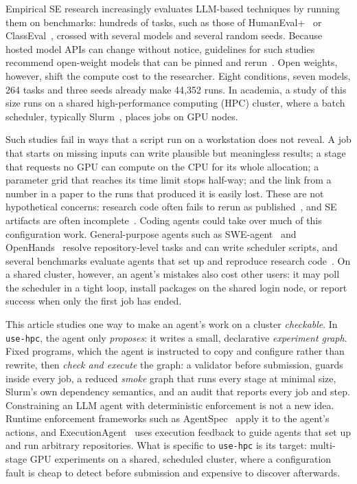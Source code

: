 \documentclass[pdflatex,sn-mathphys-num]{sn-jnl}
\theoremstyle{thmstyletwo}%
\theoremstyle{thmstylethree}%
\newcommand{\tool}{\texttt{use-hpc}}
\begin{document}
Empirical SE research increasingly evaluates LLM-based techniques by running them on benchmarks: hundreds of tasks, such as those of HumanEval+~\cite{liu2023evalplus} or ClassEval~\cite{du2024classeval}, crossed with several models and several random seeds. Because hosted model APIs can change without notice, guidelines for such studies recommend open-weight models that can be pinned and rerun~\cite{sallou2024breaking,baltes2025guidelines}. Open weights, however, shift the compute cost to the researcher. Eight conditions, seven models, 264 tasks and three seeds already make 44{,}352 runs. In academia, a study of this size runs on a shared high-performance computing (HPC) cluster, where a batch scheduler, typically Slurm~\cite{yoo2003slurm}, places jobs on GPU nodes.

Such studies fail in ways that a script run on a workstation does not reveal. A job that starts on missing inputs can write plausible but meaningless results; a stage that requests no GPU can compute on the CPU for its whole allocation; a parameter grid that reaches its time limit stops half-way; and the link from a number in a paper to the runs that produced it is easily lost. These are not hypothetical concerns: research code often fails to rerun as published~\cite{collberg2016repeatability,pimentel2019jupyter,trisovic2022research}, and SE artifacts are often incomplete~\cite{timperley2021artifact,liu2024artifacts}. Coding agents could take over much of this configuration work. General-purpose agents such as SWE-agent~\cite{yang2024sweagent} and OpenHands~\cite{wang2025openhands} resolve repository-level tasks and can write scheduler scripts, and several benchmarks evaluate agents that set up and reproduce research code~\cite{bogin2024super,siegel2024corebench,starace2025paperbench,baek2026artisan}. On a shared cluster, however, an agent's mistakes also cost other users: it may poll the scheduler in a tight loop, install packages on the shared login node, or report success when only the first job has ended.

This article studies one way to make an agent's work on a cluster \emph{checkable}. In \tool{}, the agent only \emph{proposes}: it writes a small, declarative \emph{experiment graph}. Fixed programs, which the agent is instructed to copy and configure rather than rewrite, then \emph{check and execute} the graph: a validator before submission, guards inside every job, a reduced \emph{smoke} graph that runs every stage at minimal size, Slurm's own dependency semantics, and an audit that reports every job and step. Constraining an LLM agent with deterministic enforcement is not a new idea. Runtime enforcement frameworks such as AgentSpec~\cite{wang2026agentspec} apply it to the agent's actions, and ExecutionAgent~\cite{bouzenia2025executionagent} uses execution feedback to guide agents that set up and run arbitrary repositories. What is specific to \tool{} is its target: multi-stage GPU experiments on a shared, scheduled cluster, where a configuration fault is cheap to detect before submission and expensive to discover afterwards.
\end{document}
